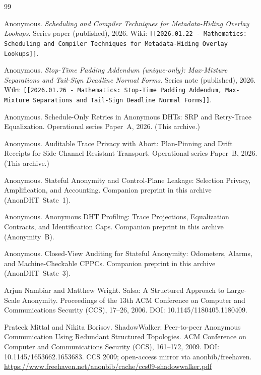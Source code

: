 \documentclass[11pt]{article}
\begin{document}
\begin{thebibliography}{99}\small

Anonymous.
\newblock \emph{Scheduling and Compiler Techniques for Metadata-Hiding Overlay Lookups}.
\newblock Series paper (published), 2026.
\newblock Wiki: \texttt{[[2026.01.22 - Mathematics: Scheduling and Compiler Techniques for Metadata-Hiding Overlay Lookups]]}.

Anonymous.
\newblock \emph{Stop-Time Padding Addendum (unique-only): Max-Mixture Separations and Tail-Sign Deadline Normal Forms}.
\newblock Series note (published), 2026.
\newblock Wiki: \texttt{[[2026.01.26 - Mathematics: Stop-Time Padding Addendum, Max-Mixture Separations and Tail-Sign Deadline Normal Forms]]}.

Anonymous.
\newblock Schedule-Only Retries in Anonymous DHTs: SRP and Retry-Trace Equalization.
\newblock Operational series Paper~A, 2026. (This archive.)

Anonymous.
\newblock Auditable Trace Privacy with Abort: Plan-Pinning and Drift Receipts for Side-Channel Resistant Transport.
\newblock Operational series Paper~B, 2026. (This archive.)

Anonymous.
\newblock Stateful Anonymity and Control-Plane Leakage: Selection Privacy, Amplification, and Accounting.
\newblock Companion preprint in this archive (AnonDHT~State~1).

Anonymous.
\newblock Anonymous DHT Profiling: Trace Projections, Equalization Contracts, and Identification Caps.
\newblock Companion preprint in this archive (Anonymity~B).

Anonymous.
\newblock Closed-View Auditing for Stateful Anonymity: Odometers, Alarms, and Machine-Checkable CPPCs.
\newblock Companion preprint in this archive (AnonDHT~State~3).

Arjun Nambiar and Matthew Wright.
\newblock Salsa: A Structured Approach to Large-Scale Anonymity.
\newblock Proceedings of the 13th ACM Conference on Computer and Communications Security (CCS), 17--26, 2006.
\newblock DOI: 10.1145/1180405.1180409.

Prateek Mittal and Nikita Borisov.
\newblock ShadowWalker: Peer-to-peer Anonymous Communication Using Redundant Structured Topologies.
\newblock ACM Conference on Computer and Communications Security (CCS), 161--172, 2009.
\newblock DOI: 10.1145/1653662.1653683.
\newblock CCS 2009; open-access mirror via anonbib/freehaven.
\newblock \url{https://www.freehaven.net/anonbib/cache/ccs09-shadowwalker.pdf}


\end{thebibliography}
\end{document}
